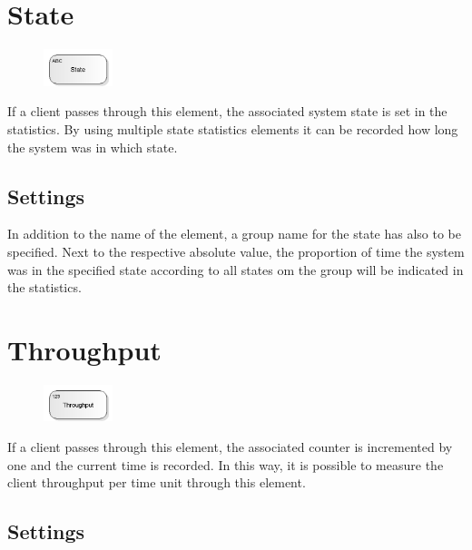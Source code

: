 \section{State}
\label{ref:ModelElementStateStatistics}

\begin{figure}
\vspace{-22pt}
\includegraphics[width=2cm]{imageModelElementStateStatistics.png}
\vspace{-22pt}
\end{figure}

If a client passes through this element, the associated system state is set in the statistics.
By using multiple state statistics elements it can be recorded how long the system
was in which state.

\subsection*{Settings}

In addition to the name of the element, a group name for the state has also to be specified.
Next to the respective absolute value, the proportion of time the system was in the specified
state according to all states om the group will be indicated in the statistics.


\section{Throughput}
\label{ref:ModelElementThroughput}

\begin{figure}
\vspace{-22pt}
\includegraphics[width=2cm]{imageModelElementThroughput.png}
\vspace{-22pt}
\end{figure}

If a client passes through this element, the associated counter is incremented by one
and the current time is recorded. In this way, it is possible to measure the client
throughput per time unit through this element.

\subsection*{Settings}

